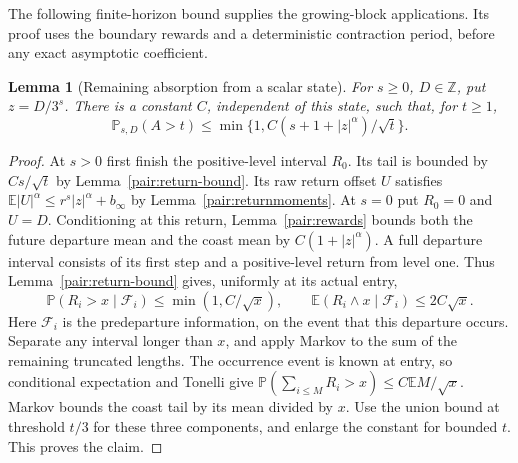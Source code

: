 \documentclass[11pt]{amsart}
\newtheorem{lemma}[theorem]{Lemma}
\theoremstyle{definition}
\theoremstyle{remark}
\newcommand{\Z}{\mathbb Z}
\newcommand{\E}{\mathbb E}
\newcommand{\PP}{\mathbb P}
\begin{document}
The following finite-horizon bound supplies the growing-block
applications. Its proof uses the boundary rewards and a deterministic
contraction period, before any exact asymptotic coefficient.

\begin{lemma}[Remaining absorption from a scalar state]\label{pair:remaining-tail}
For $s\ge0$, $D\in\Z$, put $z=D/3^s$. There is a constant $C$,
independent of this state, such that, for $t\ge1$,
\[
 \PP_{s,D}(A>t)\le
 \min\{1,C(s+1+|z|^\alpha)/\sqrt t\}.
\]
\end{lemma}
\begin{proof}
At $s>0$ first finish the positive-level interval $R_0$. Its tail is
bounded by $Cs/\sqrt t$ by Lemma~\ref{pair:return-bound}.
Its raw return offset $U$ satisfies
$\E|U|^\alpha\le r^s|z|^\alpha+b_\infty$ by
Lemma~\ref{pair:returnmoments}. At $s=0$ put $R_0=0$ and $U=D$.
Conditioning at this return, Lemma~\ref{pair:rewards} bounds both the
future departure mean and the coast mean by $C(1+|z|^\alpha)$.
A full departure interval consists of its first step and a positive-level
return from level one. Thus Lemma~\ref{pair:return-bound} gives,
uniformly at its actual entry,
\[
 \PP(R_i>x\mid\mathcal F_i)\le\min(1,C/\sqrt x),\qquad
 \E(R_i\wedge x\mid\mathcal F_i)\le2C\sqrt x.
\]
Here $\mathcal F_i$ is the predeparture information, on the event that
this departure occurs. Separate any interval longer than $x$, and
apply Markov to the sum of the remaining truncated lengths.
The occurrence event is known at entry, so conditional expectation
and Tonelli give
$\PP(\sum_{i\le M}R_i>x)\le C\E M/\sqrt x$.
Markov bounds the coast tail by its mean divided by $x$.
Use the union bound at threshold $t/3$ for these three components,
and enlarge the constant for bounded $t$. This proves the claim.
\end{proof}
\end{document}
